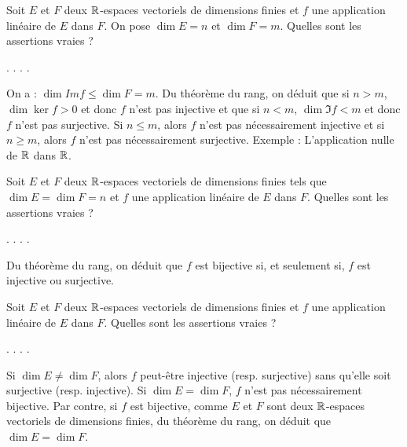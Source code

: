 \begin{question}
Soit $E$ et $F$ deux $\mathbb{R}$-espaces vectoriels de dimensions finies et $f$ une application linéaire de $E$ dans $F$. On pose $\dim E=n $ et $\dim F=m$. Quelles sont les assertions vraies ?
\begin{answers}  
.
.
.
. 
\end{answers}
\begin{explanations} On a : $\dim Im f \le \dim F=m$.
\vskip0mm
Du théorème du rang, on déduit que si $n>m$,  $\dim \ker f >0$ et donc $f$ n'est pas injective et que si $n<m$,  $\dim \Im f <m$ et donc $f$ n'est pas surjective.
\vskip0mm
Si $n\le m$, alors $f$ n'est pas nécessairement injective et si $n \ge m$, alors $f$ n'est pas nécessairement surjective. Exemple : L'application nulle de  $\mathbb{R}$ dans $\mathbb{R}$.
\end{explanations}
\end{question}

\begin{question}
Soit $E$ et $F$ deux $\mathbb{R}$-espaces vectoriels de  dimensions finies tels que $\dim E= \dim F=n$ et $f$ une application linéaire de $E$ dans $F$. Quelles sont les assertions vraies ?
\begin{answers}  
.
.
.
.  
\end{answers}
\begin{explanations} Du théorème du rang, on déduit que $f$ est bijective si, et seulement si, $f$ est injective ou surjective.
\end{explanations}
\end{question}

\begin{question}
Soit $E$ et $F$ deux $\mathbb{R}$-espaces vectoriels de dimensions finies   
et $f$ une application linéaire de $E$ dans $F$. Quelles sont les assertions vraies ?
\begin{answers}  
.
.
.
.
\end{answers}
\begin{explanations} Si $\dim E \neq \dim F$, alors $f$ peut-être injective (resp. surjective) sans qu'elle soit surjective (resp. injective).
\vskip0mm
Si $\dim E = \dim F$, $f$ n'est pas nécessairement bijective.
\vskip0mm
Par contre, si  $f$ est bijective, comme  $E$ et $F$ sont deux $\mathbb{R}$-espaces vectoriels de  dimensions finies, du théorème du rang, on déduit que $\dim E = \dim F$.
\end{explanations}
\end{question}


